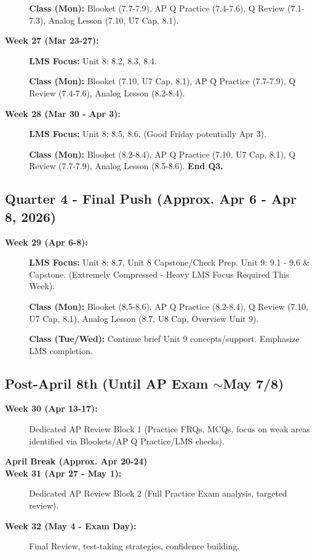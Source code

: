 \documentclass[11pt]{article}
\begin{document}
\begin{description}
  \textbf{Class (Mon):} Blooket (7.7-7.9), AP Q Practice (7.4-7.6), Q Review (7.1-7.3), Analog Lesson (7.10, U7 Cap, 8.1).
  
  \item[\textbf{Week 27 (Mar 23-27):}] \textbf{LMS Focus:} Unit 8: 8.2, 8.3, 8.4.
  
  \textbf{Class (Mon):} Blooket (7.10, U7 Cap, 8.1), AP Q Practice (7.7-7.9), Q Review (7.4-7.6), Analog Lesson (8.2-8.4).
  
  \item[\textbf{Week 28 (Mar 30 - Apr 3):}] \textbf{LMS Focus:} Unit 8: 8.5, 8.6. (Good Friday potentially Apr 3).
  
  \textbf{Class (Mon):} Blooket (8.2-8.4), AP Q Practice (7.10, U7 Cap, 8.1), Q Review (7.7-7.9), Analog Lesson (8.5-8.6). \textbf{End Q3.}
\end{description}

\subsection*{\textcolor{lynnmaroon}{Quarter 4 - Final Push (Approx. Apr 6 - Apr 8, 2026)}}

\begin{description}
  \item[\textbf{Week 29 (Apr 6-8):}] \textbf{LMS Focus:} Unit 8: 8.7, Unit 8 Capstone/Check Prep. Unit 9: 9.1 - 9.6 \& Capstone. (Extremely Compressed - Heavy LMS Focus Required This Week).
  
  \textbf{Class (Mon):} Blooket (8.5-8.6), AP Q Practice (8.2-8.4), Q Review (7.10, U7 Cap, 8.1), Analog Lesson (8.7, U8 Cap, Overview Unit 9).
  
  \textbf{Class (Tue/Wed):} Continue brief Unit 9 concepts/support. Emphasize LMS completion.
\end{description}

\begin{center}
\fbox{\Large \textbf{\textcolor{lynnmaroon}{--- TARGET DATE REACHED: April 8th ---}}}
\end{center}

\subsection*{\textcolor{lynnmaroon}{Post-April 8th (Until AP Exam $\sim$May 7/8)}}

\begin{description}
  \item[\textbf{Week 30 (Apr 13-17):}] Dedicated AP Review Block 1 (Practice FRQs, MCQs, focus on weak areas identified via Blookets/AP Q Practice/LMS checks).
  
  \item[\textbf{April Break (Approx. Apr 20-24)}]
  
  \item[\textbf{Week 31 (Apr 27 - May 1):}] Dedicated AP Review Block 2 (Full Practice Exam analysis, targeted review).
  
  \item[\textbf{Week 32 (May 4 - Exam Day):}] Final Review, test-taking strategies, confidence building.
\end{description}
\end{document}
